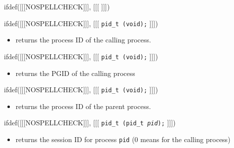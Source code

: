 
ifdef([[[NOSPELLCHECK]]], [[[
]]])

\begin{slide}
ifdef([[[NOSPELLCHECK]]], [[[
\texttt{pid\_t (void);}
]]])
\begin{itemize}
\item returns the process ID of the calling process.
\end{itemize}
ifdef([[[NOSPELLCHECK]]], [[[
\texttt{pid\_t (void);}
]]])
\begin{itemize}
\item returns the PGID of the calling process
\end{itemize}
ifdef([[[NOSPELLCHECK]]], [[[
\texttt{pid\_t (void);}
]]])
\begin{itemize}
\item returns the process ID of the parent process.
\end{itemize}
ifdef([[[NOSPELLCHECK]]], [[[
\texttt{pid\_t (pid\_t \emph{pid});}
]]])
\begin{itemize}
\item returns the session ID for process \texttt{pid} (0 means for the calling
process)
\end{itemize}
\end{slide}

